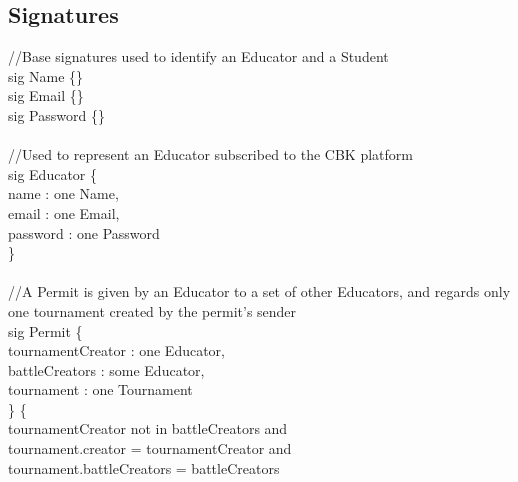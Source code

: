 \documentclass{article}
\begin{document}
{\subsection{Signatures}

\color{gray}
//Base signatures used to identify an Educator and a Student \\
\color{blue}
sig
\color{black}
Name  \{\}\\
\color{blue}
sig
\color{black}
Email \{\}\\
\color{blue}
sig
\color{black}
Password \{\}\\
\color{gray}\\
//Used to represent an Educator subscribed to the CBK platform \\
\color{blue}
sig
\color{black}
Educator  \{\\
\-\hspace{1cm}    name : \color{blue} one \color{black} Name,\\
\-\hspace{1cm}    email : \color{blue} one \color{black} Email,\\
\-\hspace{1cm}    password : \color{blue} one \color{black} Password\\
\} \\
\\
\color{gray}
//A Permit is given by an Educator to a set of other Educators, and regards only one tournament created by the permit's sender\\
\color{blue}
sig
\color{black}
Permit \{\\
\-\hspace{1cm}    tournamentCreator : \color{blue} one \color{black} Educator,\\
\-\hspace{1cm}    battleCreators : \color{blue} some \color{black} Educator,\\
\-\hspace{1cm}    tournament : \color{blue} one \color{black} Tournament\\
\}	\{\\
\-\hspace{1cm}    tournamentCreator \color{blue} not in \color{black} battleCreators \color{blue} and \color{black}\\
\-\hspace{1cm}    tournament.creator \color{blue} = \color{black} tournamentCreator \color{blue} and \color{black}\\
\-\hspace{1cm}    tournament.battleCreators \color{blue} = \color{black} battleCreators\\
}
\end{document}

